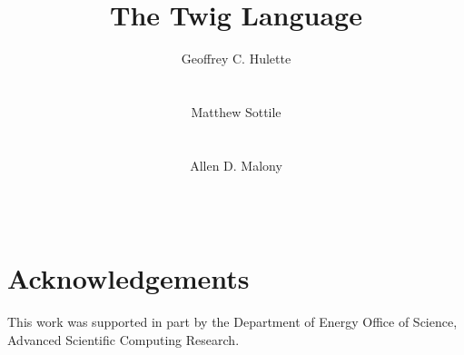\documentclass{acm_proc_article-sp}
\begin{document}
\title{The Twig Language}


\author{
\alignauthor
Geoffrey C. Hulette\\
\\
\\
\alignauthor
Matthew Sottile\\
\\
\\
\alignauthor
Allen D. Malony\\
\\
\\
}

\maketitle










\section{Acknowledgements}

This work was supported in part by the Department of Energy Office of Science,
Advanced Scientific Computing Research.



\end{document}
